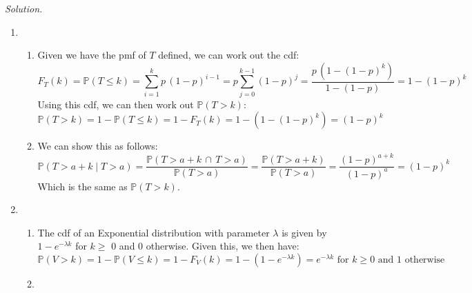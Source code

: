 \documentclass[11pt]{article}
\newenvironment{solution}{%
  \noindent\textit{Solution.}\quad
}{\par\bigskip}
\begin{document}
\begin{solution}
\begin{enumerate}
      \item \begin{enumerate}[label=(\roman*)]
            \item Given we have the pmf of $T$ defined, we can work out the cdf:
                  \[
                  F_T(k) = \mathbb{P}(T \le k) = \sum_{i=1}^{k}{p \, (1 - p)^{i - 1}}
                        = p \sum_{j=0}^{k-1}{(1 - p)^{j}} = \frac{p \, (1 - (1 - p)^{k})}
                        {1 - (1 - p)} = {1 - (1 - p)^{k}}
                  \]
                  Using this cdf, we can then work out $\mathbb{P}(T > k)$:
                  \[
                  \mathbb{P}(T > k) = 1 - \mathbb{P}(T \le k) = 1 - F_T(k) = 
                        1 - \left({1 - (1 - p)^{k}}\right) = {(1 - p)^{k}}
                  \]
            \item We can show this as follows:
                  \[
                  \mathbb{P}(T > a + k \mid T > a) = \frac{\mathbb{P}(T > a + k
                        \, \cap \, T > a)}{\mathbb{P}(T > a)}
                        = \frac{\mathbb{P}(T > a + k)}{\mathbb{P}(T > a)}
                        = \frac{(1 - p)^{a + k}}{(1 - p)^{a}} = {(1 - p)^k}
                  \]
                  Which is the same as $\mathbb{P}(T > k)$.
            \end{enumerate}
      \item \begin{enumerate}[label=(\roman*)]
            \item The cdf of an Exponential distribution with parameter $\lambda$ 
                  is given by $1 - e^{-\lambda k}$ for $k \ge$ 0 and 0 otherwise.
                  Given this, we then have:
                  \[
                  \mathbb{P}(V > k) = 1 - \mathbb{P}(V \le k) = 1 - F_V(k) = 
                        1 - (1 - e^{-\lambda k}) = e^{-\lambda k} \text{ for } k 
                        \ge 0 \text{ and 1 otherwise}
                  \]
            \item 
            \end{enumerate}
\end{enumerate}
\end{solution}
\end{document}
